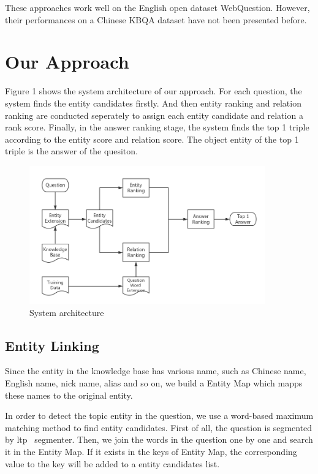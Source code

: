 \documentclass{llncs}
\begin{document}
These approaches work well on the English open dataset WebQuestion. However,
their performances on a Chinese KBQA dataset have not been presented before.

\section{Our Approach}
Figure 1 shows the system architecture of our approach. For each question, the 
system finds the entity candidates firstly. And then entity ranking and relation 
ranking are conducted seperately to assign each entity candidate and relation a
rank score. Finally, in the answer ranking stage, the system finds the top 1 
triple according to the entity score and relation score. The object entity 
of the top 1 triple is the answer of the quesiton.
\begin{figure}
\centering
  \includegraphics[width=4in]{nlpcc2018-kbqa-workflow.png}
  \caption[width=\textwidth]{System architecture}
\end{figure}

\subsection{Entity Linking}

Since the entity in the knowledge base has various name, such as Chinese name, 
English name, nick name, alias and so on, we build a Entity Map which mapps 
these names to the original entity.

In order to detect the topic entity in the question, we use a word-based maximum 
matching method to find entity candidates. First of all, the question is 
segmented by ltp\footnotemark\ \cite{Wanxiang} segmenter. Then, we join the words in the 
question one by one and search it in the Entity Map. If it exists in the 
keys of Entity Map, the corresponding value to the key will be added to a 
entity candidates list.
\end{document}
